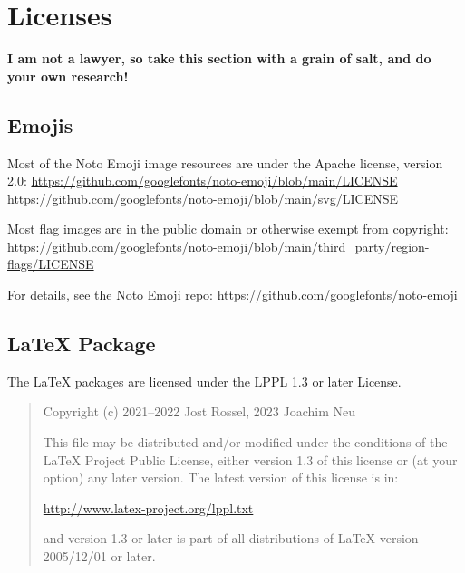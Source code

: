 \section{Licenses}

\textbf{I am not a lawyer, so take this section with a grain of salt, and do your own research!}

\subsection{Emojis}

Most of the Noto Emoji image resources are under the Apache license, version 2.0:
\url{https://github.com/googlefonts/noto-emoji/blob/main/LICENSE}
\url{https://github.com/googlefonts/noto-emoji/blob/main/svg/LICENSE}

Most flag images are in the public domain or otherwise exempt from copyright:
\url{https://github.com/googlefonts/noto-emoji/blob/main/third_party/region-flags/LICENSE}

For details, see the Noto Emoji repo:
\url{https://github.com/googlefonts/noto-emoji}

\subsection{LaTeX Package}

The LaTeX packages are licensed under the LPPL 1.3 or later License.

\begin{quote}
  Copyright (c) 2021--2022 Jost Rossel, 2023 Joachim Neu

  This file may be distributed and/or
  modified under the conditions of the LaTeX Project Public License,
  either version 1.3 of this license or (at your option) any later
  version. The latest version of this license is in:

  \url{http://www.latex-project.org/lppl.txt}

  and version 1.3 or later is part of all distributions of LaTeX version
  2005/12/01 or later.
\end{quote}
